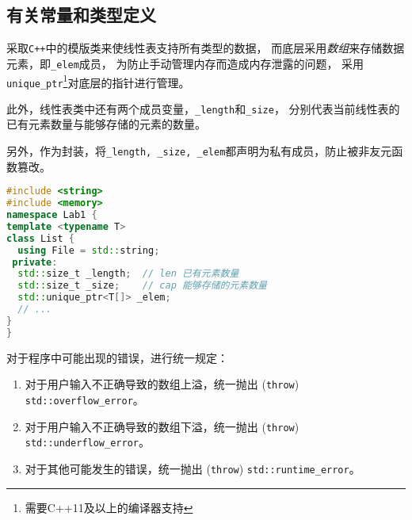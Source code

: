 \subsection{有关常量和类型定义}
采取\texttt{C++}中的模版类来使线性表支持所有类型的数据，
而底层采用\emph{数组}来存储数据元素，即\texttt{\_elem}成员，
为防止手动管理内存而造成内存泄露的问题，
采用\texttt{unique\_ptr}\footnote{需要C++11及以上的编译器支持}对底层的指针进行管理。
\par
此外，线性表类中还有两个成员变量，\texttt{\_length}和\texttt{\_size}，
分别代表当前线性表的已有元素数量与能够存储的元素的数量。
\par
另外，作为封装，将\texttt{\_length, \_size, \_elem}都声明为私有成员，防止被非友元函数篡改。
\begin{lstlisting}[language=c++]
#include <string>
#include <memory>
namespace Lab1 {
template <typename T>
class List {
  using File = std::string;
 private:
  std::size_t _length;  // len 已有元素数量
  std::size_t _size;    // cap 能够存储的元素数量
  std::unique_ptr<T[]> _elem;
  // ...
}
}
\end{lstlisting}
对于程序中可能出现的错误，进行统一规定：
\begin{enumerate}
    \item 对于用户输入不正确导致的数组上溢，统一抛出 (\texttt{throw}) \texttt{std::overflow\_error}。
    \item 对于用户输入不正确导致的数组下溢，统一抛出 (\texttt{throw}) \texttt{std::underflow\_error}。
    \item 对于其他可能发生的错误，统一抛出 (\texttt{throw}) \texttt{std::runtime\_error}。
\end{enumerate}
